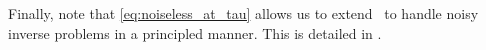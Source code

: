 Finally, note that \eqref{eq:noiseless_at_tau} allows us to extend \smcdiff\, to handle noisy inverse problems in a principled manner. This is detailed in .
